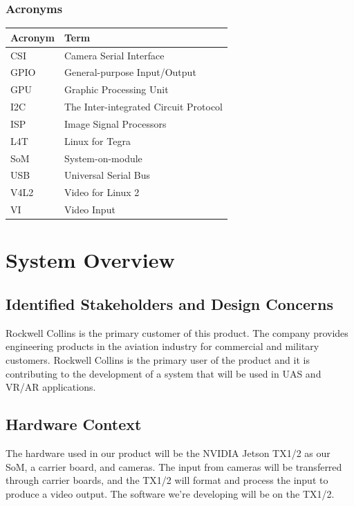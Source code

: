 \documentclass[letterpaper,10pt,serif,draftclsnofoot,onecolumn,compsoc,titlepage]{IEEEtran}
\begin{document}
\subsubsection{Acronyms}

\begin{tabular}{|l|l|}
	\hline
	\textbf{Acronym} & \textbf{Term}\\
	\hline
	CSI & Camera Serial Interface\\
	\hline
	GPIO & General-purpose Input/Output\\
	\hline
	GPU & Graphic Processing Unit\\
	\hline
	I2C & The Inter-integrated Circuit Protocol\\
	\hline
	ISP & Image Signal Processors\\
	\hline
	L4T & Linux for Tegra \\
	\hline
	SoM & System-on-module\\
	\hline
	USB & Universal Serial Bus\\
	\hline
	V4L2 & Video for Linux 2 \\
	\hline
	VI & Video Input\\
	\hline
\end{tabular}

\newpage
\section{System Overview}  

\subsection{Identified Stakeholders and Design Concerns}

Rockwell Collins is the primary customer of this product. The company provides 
engineering products in the aviation industry for commercial and military customers. 
Rockwell Collins is the primary user of the product and it is contributing 
to the development of a system that will be used in UAS and VR/AR applications. \\

\subsection{Hardware Context}

The hardware used in our product will be the NVIDIA Jetson TX1/2 as our SoM, 
a carrier board, and cameras. The input from cameras will be transferred through 
carrier boards, and the TX1/2 will format and process the input to produce a 
video output. The software we're developing will be on the TX1/2. \\
\end{document}
